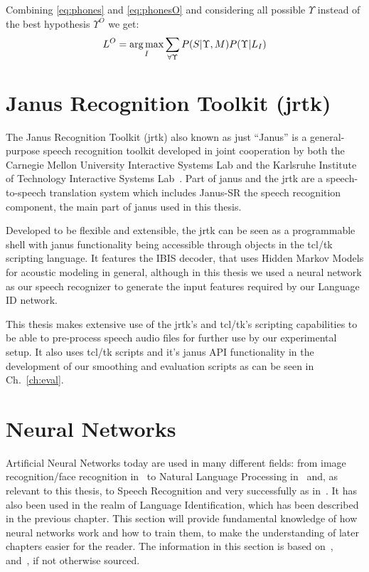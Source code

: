 Combining \ref{eq:phones} and \ref{eq:phonesO} and considering all possible \(\Upsilon\) instead of the best hypothesis \(\Upsilon^O\) we get:
\begin{equation}
L^O = \operatorname*{arg\,max}_{I}\sum_{\forall \Upsilon}P(S|\Upsilon, M)P(\Upsilon|L_I)
\end{equation}

\section{Janus Recognition Toolkit (jrtk)}
\label{sec:fund:jrtk}
The Janus Recognition Toolkit (jrtk) also known as just ``Janus'' is a general-purpose speech recognition toolkit developed in joint cooperation by both the Carnegie Mellon University Interactive Systems Lab and the Karlsruhe Institute of Technology Interactive Systems Lab~\cite{lavie1997janus}. Part of janus and the jrtk are a speech-to-speech translation system which includes Janus-SR the speech recognition component, the main part of janus used in this thesis. 

Developed to be flexible and extensible, the jrtk can be seen as a programmable shell with janus functionality being accessible through objects in the tcl/tk scripting language. It features the IBIS decoder, that uses Hidden Markov Models for acoustic modeling in general, although in this thesis we used a neural network as our speech recognizer to generate the input features required by our Language ID network.

This thesis makes extensive use of the jrtk's and tcl/tk's scripting capabilities to be able to pre-process speech audio files for further use by our experimental setup. It also uses tcl/tk scripts and it's janus API functionality in the development of our smoothing and evaluation scripts as can be seen in Ch.~\ref{ch:eval}.
\section{Neural Networks}
\label{sec:fund:NN}
Artificial Neural Networks today are used in many different fields: from image recognition/face recognition in~\cite{lawrence1997face} to Natural Language Processing in~\cite{collobert2008unified} and, as relevant to this thesis, to Speech Recognition and very successfully as in~\cite{hinton2012deep}. It has also been used in the realm of Language Identification, which has been described in the previous chapter. This section will provide fundamental knowledge of how neural networks work and how to train them, to make the understanding of later chapters easier for the reader. The information in this section is based on~\cite{haykin2004comprehensive}, ~\cite{Goodfellow-et-al-2016} and~\cite{deeplearning-online}, if not otherwise sourced.


